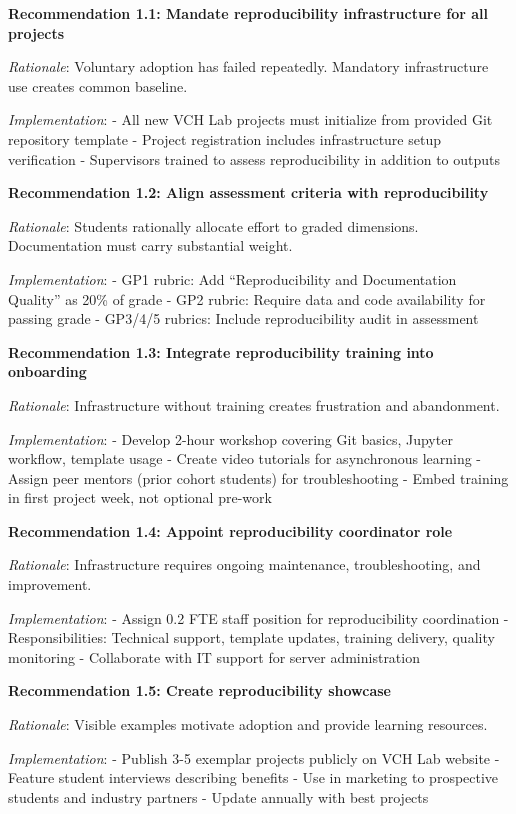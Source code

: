 \documentclass[
  oneside,
  open=any]{scrbook}
\begin{document}
\textbf{Recommendation 1.1: Mandate reproducibility infrastructure for
all projects}

\emph{Rationale}: Voluntary adoption has failed repeatedly. Mandatory
infrastructure use creates common baseline.

\emph{Implementation}: - All new VCH Lab projects must initialize from
provided Git repository template - Project registration includes
infrastructure setup verification - Supervisors trained to assess
reproducibility in addition to outputs

\textbf{Recommendation 1.2: Align assessment criteria with
reproducibility}

\emph{Rationale}: Students rationally allocate effort to graded
dimensions. Documentation must carry substantial weight.

\emph{Implementation}: - GP1 rubric: Add ``Reproducibility and
Documentation Quality'' as 20\% of grade - GP2 rubric: Require data and
code availability for passing grade - GP3/4/5 rubrics: Include
reproducibility audit in assessment

\textbf{Recommendation 1.3: Integrate reproducibility training into
onboarding}

\emph{Rationale}: Infrastructure without training creates frustration
and abandonment.

\emph{Implementation}: - Develop 2-hour workshop covering Git basics,
Jupyter workflow, template usage - Create video tutorials for
asynchronous learning - Assign peer mentors (prior cohort students) for
troubleshooting - Embed training in first project week, not optional
pre-work

\textbf{Recommendation 1.4: Appoint reproducibility coordinator role}

\emph{Rationale}: Infrastructure requires ongoing maintenance,
troubleshooting, and improvement.

\emph{Implementation}: - Assign 0.2 FTE staff position for
reproducibility coordination - Responsibilities: Technical support,
template updates, training delivery, quality monitoring - Collaborate
with IT support for server administration

\textbf{Recommendation 1.5: Create reproducibility showcase}

\emph{Rationale}: Visible examples motivate adoption and provide
learning resources.

\emph{Implementation}: - Publish 3-5 exemplar projects publicly on VCH
Lab website - Feature student interviews describing benefits - Use in
marketing to prospective students and industry partners - Update
annually with best projects
\end{document}
